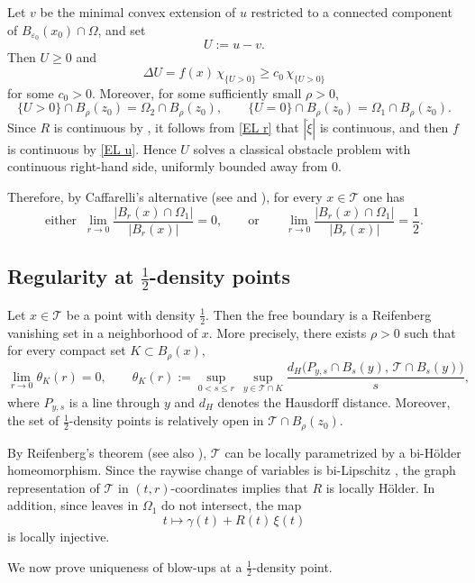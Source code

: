 \documentclass[reqno,11pt]{amsart}
\numberwithin{equation}{section}
\theoremstyle{remark}
\begin{document}
Let $v$ be the minimal convex extension of $u$ restricted to a connected component of
$B_{\varepsilon_0}(x_0)\cap\Omega$, and set
$$
U:=u-v.
$$
Then $U\ge0$ and
\begin{equation}\label{w obstacle}
\Delta U=f(x)\,\chi_{\{U>0\}}\ge c_0\,\chi_{\{U>0\}}
\end{equation}
for some $c_0>0$. Moreover, for some sufficiently small $\rho>0$,
\[
\{U>0\}\cap B_\rho(z_0)=\Omega_2\cap B_\rho(z_0),
\qquad
\{U=0\}\cap B_\rho(z_0)=\Omega_1\cap B_\rho(z_0).
\]
Since $R$ is continuous by \cite[Lemma~7.4]{MRZ20252}, it follows from \eqref{EL r} that
$|\dot\xi|$ is continuous, and then $f$ is continuous by \eqref{EL u}. Hence $U$ solves a
classical obstacle problem with continuous right-hand side, uniformly bounded away from $0$.

Therefore, by Caffarelli's alternative
(see \cite{C1977,C1998} and \cite[Theorem~0.3]{B2001}), for every $x\in\mathcal T$ one has
\[
\text{either }\ \lim_{r\to0}\frac{|B_r(x)\cap\Omega_1|}{|B_r(x)|}=0,
\qquad\text{or}\qquad
\lim_{r\to0}\frac{|B_r(x)\cap\Omega_1|}{|B_r(x)|}=\frac12.
\]

\subsection{Regularity at $\frac12$-density points}

Let $x\in\mathcal T$ be a point with density $\frac12$.
Then the free boundary is a Reifenberg vanishing set in a neighborhood of $x$.
More precisely, there exists $\rho>0$ such that for every compact set
$K\subset B_\rho(x)$,
\[
\lim_{r\to0}\theta_K(r)=0,
\qquad
\theta_K(r)
:=
\sup_{0<s\le r}\,
\sup_{y\in \mathcal T\cap K}
\frac{d_H\bigl(P_{y,s}\cap B_s(y),\,\mathcal T\cap B_s(y)\bigr)}{s},
\]
where $P_{y,s}$ is a line through $y$ and $d_H$ denotes the Hausdorff distance.
Moreover, the set of $\frac12$-density points is relatively open in
$\mathcal T\cap B_\rho(z_0)$.

By Reifenberg's theorem \cite{R1960}
(see also \cite[Section~3]{DKT2001}),
$\mathcal T$ can be locally parametrized by a bi-H\"older homeomorphism.
Since the raywise change of variables is bi-Lipschitz
\cite[Corollary~6.6]{MRZ20252}, the graph representation of $\mathcal T$ in
$(t,r)$-coordinates implies that $R$ is locally H\"older.
In addition, since leaves in $\Omega_1$ do not intersect, the map
\[
t\longmapsto \gamma(t)+R(t)\,\xi(t)
\]
is locally injective.

We now prove uniqueness of blow-ups at a $\frac12$-density point.
\end{document}
